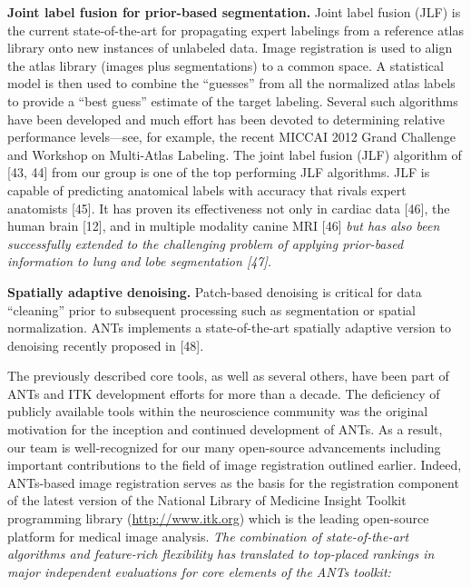 \documentclass[11pt,]{article}
\begin{document}
\textbf{Joint label fusion for prior-based segmentation.} Joint label
fusion (JLF) is the current state-of-the-art for propagating expert
labelings from a reference atlas library onto new instances of unlabeled
data. Image registration is used to align the atlas library (images plus
segmentations) to a common space. A statistical model is then used to
combine the ``guesses'' from all the normalized atlas labels to provide
a ``best guess'' estimate of the target labeling. Several such
algorithms have been developed and much effort has been devoted to
determining relative performance levels---see, for example, the recent
MICCAI 2012 Grand Challenge and Workshop on Multi-Atlas Labeling. The
joint label fusion (JLF) algorithm of {[}43, 44{]} from our group is one
of the top performing JLF algorithms. JLF is capable of predicting
anatomical labels with accuracy that rivals expert anatomists {[}45{]}.
It has proven its effectiveness not only in cardiac data {[}46{]}, the
human brain {[}12{]}, and in multiple modality canine MRI {[}46{]}
\emph{but has also been successfully extended to the challenging problem
of applying prior-based information to lung and lobe segmentation
{[}47{]}.}

\textbf{Spatially adaptive denoising.} Patch-based denoising is critical
for data ``cleaning'' prior to subsequent processing such as
segmentation or spatial normalization. ANTs implements a
state-of-the-art spatially adaptive version to denoising recently
proposed in {[}48{]}.

The previously described core tools, as well as several others, have
been part of ANTs and ITK development efforts for more than a decade.
The deficiency of publicly available tools within the neuroscience
community was the original motivation for the inception and continued
development of ANTs. As a result, our team is well-recognized for our
many open-source advancements including important contributions to the
field of image registration outlined earlier. Indeed, ANTs-based image
registration serves as the basis for the registration component of the
latest version of the National Library of Medicine Insight Toolkit
programming library (\url{http://www.itk.org}) which is the leading
open-source platform for medical image analysis. \emph{The combination
of state-of-the-art algorithms and feature-rich flexibility has
translated to top-placed rankings in major independent evaluations for
core elements of the ANTs toolkit:}
\end{document}
